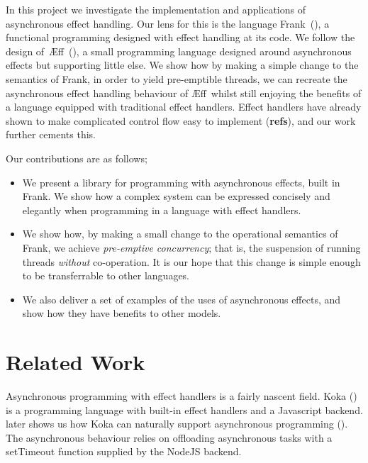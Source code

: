 \documentclass[msc,deptreport,cs]{infthesis} %
\newcommand\aeff{{\AE}ff\xspace}
\newcommand{\todo}[1]
           {{\par\noindent\small\color{RoyalPurple}
  \framebox{\parbox{\dimexpr\linewidth-2\fboxsep-2\fboxrule}
    {\textbf{TODO:} #1}}}}
\begin{document}
In this project we investigate the implementation and applications of
asynchronous effect handling. Our lens for this is the language
Frank~(\cite{lindley2017do, convent2020doo}), a functional programming designed
with effect handling at its code. We follow the design
of~\aeff~(\cite{ahman2020asynchronous}), a small programming language designed
around asynchronous effects but supporting little else.
%
We show how by making a simple change to the semantics of Frank, in order to
yield pre-emptible threads, we can recreate the asynchronous effect handling
behaviour of \aeff~whilst still enjoying the benefits of a language equipped
with traditional effect handlers.
%
Effect handlers have already shown to make complicated control flow easy to
implement (\textbf{refs}), and our work further cements this.

Our contributions are as follows;

\begin{itemize}
\item We present a library for programming with asynchronous effects, built in
  Frank. We show how a complex system can be expressed concisely and elegantly
  when programming in a language with effect handlers.

\item We show how, by making a small change to the operational semantics of
  Frank, we achieve \emph{pre-emptive concurrency}; that is, the suspension of
  running threads \emph{without} co-operation. It is our hope that this change
  is simple enough to be transferrable to other languages.

\item We also deliver a set of examples of the uses of asynchronous effects, and
  show how they have benefits to other models.
\end{itemize}

\section{Related Work}

Asynchronous programming with effect handlers is a fairly nascent field.
%
Koka (\cite{leijen2014koka}) is a programming language with built-in effect
handlers and a Javascript backend. \citeauthor{leijen2017structured} later shows
us how Koka can naturally support asynchronous programming
(\cite{leijen2017structured}). The asynchronous behaviour relies on offloading
asynchronous tasks with a \textsf{setTimeout} function supplied by the NodeJS
backend.
\end{document}
